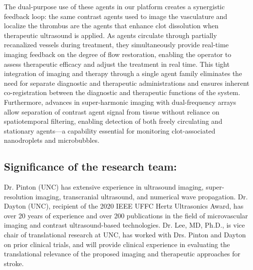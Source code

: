 The dual-purpose use of these agents in our platform creates a synergistic feedback loop: the same contrast agents used to image the vasculature and localize the thrombus are the agents that enhance clot dissolution when therapeutic ultrasound is applied. As agents circulate through partially recanalized vessels during treatment, they simultaneously provide real-time imaging feedback on the degree of flow restoration, enabling the operator to assess therapeutic efficacy and adjust the treatment in real time. This tight integration of imaging and therapy through a single agent family eliminates the need for separate diagnostic and therapeutic administrations and ensures inherent co-registration between the diagnostic and therapeutic functions of the system. Furthermore, advances in super-harmonic imaging with dual-frequency arrays~\cite{kierski2020superharmonic,kierski2022acoustic} allow separation of contrast agent signal from tissue without reliance on spatiotemporal filtering, enabling detection of both freely circulating and stationary agents---a capability essential for monitoring clot-associated nanodroplets and microbubbles.

\subsection{Significance of the research team:} Dr. Pinton (UNC) has extensive experience in ultrasound imaging, super-resolution imaging, transcranial ultrasound, and numerical wave propagation. Dr. Dayton (UNC), recipient of the 2020 IEEE UFFC Hertz Ultrasonics Award, has over 20 years of experience and over 200 publications in the field of microvascular imaging and contrast ultrasound-based technologies. Dr. Lee, MD, Ph.D., is vice chair of translational research at UNC, has worked with Drs. Pinton and Dayton on prior clinical trials, and will provide clinical experience in evaluating the translational relevance of the proposed imaging and therapeutic approaches for stroke.
